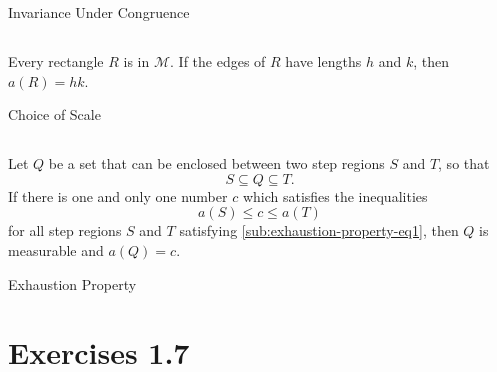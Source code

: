 \documentclass{report}
\begin{document}
\begin{axiom}

    {Invariance Under Congruence}

\end{axiom}

\subsection{}%
\label{sub:area-choice-scale}

Every rectangle $R$ is in $\mathscr{M}$.
If the edges of $R$ have lengths $h$ and $k$, then $a(R) = hk$.

\begin{axiom}

    {Choice of Scale}

\end{axiom}

\subsection{}%
\label{sub:area-exhaustion-property}

Let $Q$ be a set that can be enclosed between two step regions $S$ and $T$, so
  that
  \begin{equation}
    \label{sub:exhaustion-property-eq1}
    S \subseteq Q \subseteq T.
  \end{equation}
If there is one and only one number $c$ which satisfies the inequalities
  $$a(S) \leq c \leq a(T)$$ for all step regions $S$ and $T$ satisfying
  \eqref{sub:exhaustion-property-eq1}, then $Q$ is measurable and $a(Q) = c$.

\begin{axiom}

    {Exhaustion Property}

\end{axiom}

\section{Exercises 1.7}%
\label{sec:exercises-1.7}

\subsection{}%
\label{sub:exercise-1.7.1}
\end{document}
